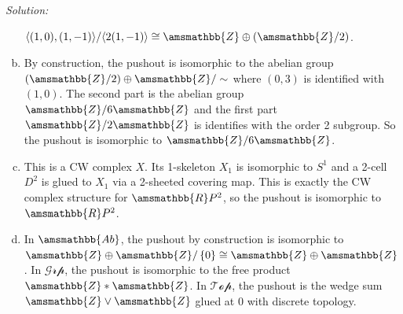 \documentclass[a4paper, 12pt]{article}
\newenvironment{solution}
    {\textit{Solution:}}
    {}
\newcommand{\la}{\langle}
\newcommand{\ra}{\rangle}
\renewcommand{\mathbb}{\amsmathbb}
\begin{document}
\begin{solution}
\begin{enumerate}[(a)]
\(\la (1,0),(1,-1)\ra/\la 2(1,-1)\ra\cong \mathbb{Z}\oplus (\mathbb{Z}/2)\).
\item By construction, the pushout is isomorphic to the abelian group \((\mathbb{Z}/2)\oplus \mathbb{Z}/\sim\) where \((0,3)\) is identified with \((1,0)\). The second part is the abelian group \(\mathbb{Z}/6 \mathbb{Z}\) and 
the first part \(\mathbb{Z}/2 \mathbb{Z}\) is identifies with the order 2 subgroup. So the pushout is isomorphic to \(\mathbb{Z}/6 \mathbb{Z}\). 
\item This is a CW complex \(X\). Its 1-skeleton \(X_1\) is isomorphic to \(S^1\) and a 2-cell \(D^2\) is glued to \(X_1\) via a 2-sheeted covering map. This is exactly the CW complex structure for \(\mathbb{R}P^2\), so the pushout is isomorphic to \(\mathbb{R}P^2\). 
\item In \(\mathbb{Ab}\), the pushout by construction is isomorphic to \(\mathbb{Z}\oplus \mathbb{Z}/\left\{ 0 \right\}\cong \mathbb{Z}\oplus \mathbb{Z}\). In \(\mathcal{Grp}\), the pushout is isomorphic to the free product \(\mathbb{Z}*\mathbb{Z}\). In \(\mathcal{Top}\), the pushout is the wedge sum 
\(\mathbb{Z}\vee \mathbb{Z}\) glued at \(0\) with discrete topology.
\end{enumerate}
\end{solution}
\end{document}
